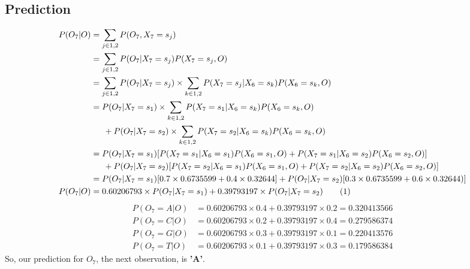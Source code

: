 \documentclass[a4paper,doc,notimes]{article}
\newcommand\numberthis{\addtocounter{equation}{1}\tag{\theequation}}
\begin{document}
\subsection{Prediction}
\begin{align*}
P(O_7|O) & = \sum_{j\in1,2} P(O_7, X_7=s_j) \\
& =  \sum_{j\in1,2} P(O_7| X_7=s_j) P(X_7=s_j, O) \\
& =  \sum_{j\in1,2} P(O_7| X_7=s_j) \times \sum_{k\in 1,2} P(X_7=s_j | X_6=s_k)  P(X_6=s_k, O) \\
& =  P(O_7| X_7=s_1) \times \sum_{k\in 1,2} P(X_7=s_1 | X_6=s_k)  P(X_6=s_k, O)  \\
& \indent + P(O_7| X_7=s_2) \times \sum_{k\in 1,2} P(X_7=s_2 | X_6=s_k)  P(X_6=s_k, O) \\
& = P(O_7| X_7=s_1) [ P(X_7=s_1 | X_6=s_1)  P(X_6=s_1, O) + P(X_7=s_1 | X_6=s_2)  P(X_6=s_2, O) ] \\
& \indent + P(O_7| X_7=s_2) [P(X_7=s_2 | X_6=s_1)  P(X_6=s_1, O) +  P(X_7=s_2 | X_6=s_2)  P(X_6=s_2, O)] \\
& = P(O_7| X_7=s_1) [ 0.7  \times 0.6735599 + 0.4 \times  0.32644]  + P(O_7| X_7=s_2) [0.3 \times 0.6735599  +  0.6  \times  0.32644)] \\
P(O_7|O)  & = 0.60206793 \times P(O_7| X_7=s_1)  + 0.39793197 \times P(O_7| X_7=s_2) \numberthis 
\end{align*}
\begin{align*}
 P(O_7=A | O) &=  0.60206793 \times 0.4 + 0.39793197 \times 0.2 = 0.320413566  \\
 P(O_7=C | O) &=  0.60206793 \times 0.2 + 0.39793197 \times 0.4 = 0.279586374  \\
 P(O_7=G | O) &=  0.60206793 \times 0.3 + 0.39793197 \times 0.1 = 0.220413576  \\
 P(O_7=T | O) &=  0.60206793 \times 0.1 + 0.39793197 \times 0.3 = 0.179586384 
\end{align*}
So, our prediction for $O_7$, the next observation, is \textbf{'A'}.
\end{document}
